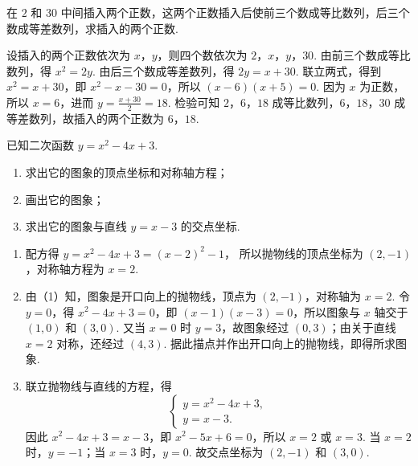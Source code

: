 \begin{problem}
在 \(2\) 和 \(30\) 中间插入两个正数，这两个正数插入后使前三个数成等比数列，后三个数成等差数列，求插入的两个正数.
\end{problem}

\begin{solution}
设插入的两个正数依次为 \(x\)，\(y\)，则四个数依次为 \(2\)，\(x\)，\(y\)，\(30\). 由前三个数成等比数列，得 \(x^{2}=2y\). 由后三个数成等差数列，得 \(2y=x+30\). 联立两式，得到 \(x^{2}=x+30\)，即 \(x^{2}-x-30=0\)，所以 \(\left(x-6\right)\left(x+5\right)=0\).
因为 \(x\) 为正数，所以 \(x=6\)，进而 \(y=\frac{x+30}{2}=18\). 检验可知 \(2\)，\(6\)，\(18\) 成等比数列，\(6\)，\(18\)，\(30\) 成等差数列，故插入的两个正数为 \(6\)，\(18\).
\end{solution}

\begin{problem}
已知二次函数 \(y=x^{2}-4x+3\).

\begin{enumerate}
\item 求出它的图象的顶点坐标和对称轴方程；
\item 画出它的图象；
\item 求出它的图象与直线 \(y=x-3\) 的交点坐标.
\end{enumerate}
\end{problem}

\begin{solution}
\begin{enumerate}
\item 配方得 \(y=x^{2}-4x+3=\left(x-2\right)^{2}-1\)，
所以抛物线的顶点坐标为 \(\left(2,-1\right)\)，对称轴方程为 \(x=2\).

\item 由（1）知，图象是开口向上的抛物线，顶点为 \(\left(2,-1\right)\)，对称轴为 \(x=2\). 令 \(y=0\)，得 \(x^{2}-4x+3=0\)，即 \(\left(x-1\right)\left(x-3\right)=0\)，所以图象与 \(x\) 轴交于 \(\left(1,0\right)\) 和 \(\left(3,0\right)\). 又当 \(x=0\) 时 \(y=3\)，故图象经过 \(\left(0,3\right)\)；由关于直线 \(x=2\) 对称，还经过 \(\left(4,3\right)\). 据此描点并作出开口向上的抛物线，即得所求图象.

\item 联立抛物线与直线的方程，得
\[
\begin{cases}
y=x^{2}-4x+3,\\
y=x-3.
\end{cases}
\]
因此 \(x^{2}-4x+3=x-3\)，即 \(x^{2}-5x+6=0\)，所以 \(x=2\) 或 \(x=3\). 当 \(x=2\) 时，\(y=-1\)；当 \(x=3\) 时，\(y=0\). 故交点坐标为 \(\left(2,-1\right)\) 和 \(\left(3,0\right)\).
\end{enumerate}
\end{solution}

